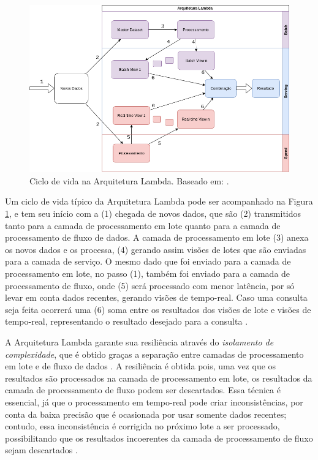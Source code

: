 \begin{figure}[hbt]
  \centering
    \includegraphics[width=\textwidth]{figuras/lambda-lifecycle.png}
    \caption{Ciclo de vida na Arquitetura Lambda. Baseado em: .}
  \label{fig:lambda-lifecycle}
\end{figure}

Um ciclo de vida típico da Arquitetura Lambda pode ser acompanhado na Figura
\ref{fig:lambda-lifecycle}, e tem seu início com a (1) chegada
de novos dados, que são (2) transmitidos tanto para a camada
de processamento em lote quanto para a camada de processamento de fluxo de dados.
A camada de processamento em lote (3) anexa os novos dados e os processa, (4) gerando assim
visões de lotes que são enviadas para a camada de serviço. O mesmo
dado que foi enviado para a camada de processamento em lote, no passo (1), também foi
enviado para a camada de processamento de fluxo, onde (5) será processado com menor latência,
por só levar em conta dados recentes, gerando visões de tempo-real. 
Caso uma consulta seja feita ocorrerá uma (6) soma entre os resultados
dos visões de lote e visões de tempo-real, representando o resultado
desejado para a consulta \cite{marz2015}.

A Arquitetura Lambda garante sua resiliência através do \textit{isolamento de
complexidade}, que é obtido graças a separação entre camadas de processamento em
lote e de fluxo de dados \cite{marz2015}. A resiliência é obtida pois, uma vez que os
resultados são processados na camada de processamento em lote, os resultados da camada
de processamento de fluxo podem ser descartados. Essa técnica é essencial, já que o
processamento em tempo-real pode criar inconsistências, por conta da baixa
precisão que é ocasionada por usar somente dados recentes; contudo, essa
inconsistência é corrigida no próximo lote a ser processado,
possibilitando que os resultados incoerentes da camada de processamento de fluxo
sejam descartados \cite{marz2015}.

